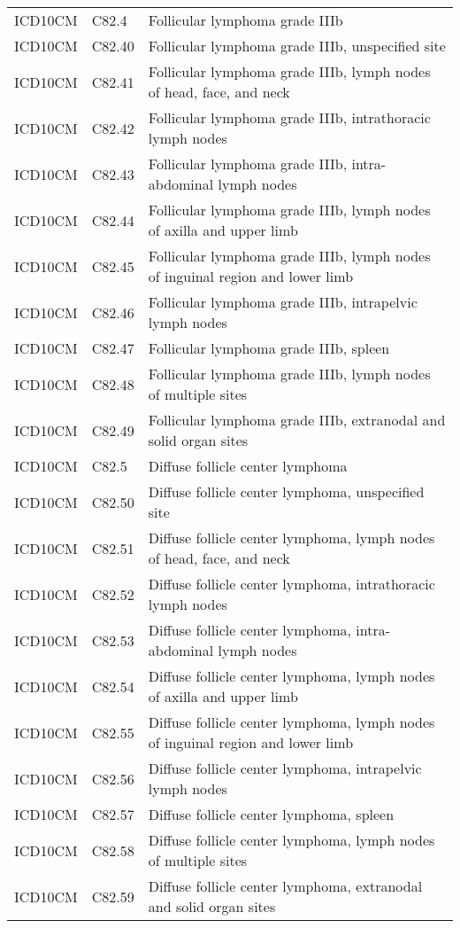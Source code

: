\begin{table}[ht]
\begin{tabular}{lll}
  ICD10CM & C82.4 & Follicular lymphoma grade IIIb \\ 
  ICD10CM & C82.40 & Follicular lymphoma grade IIIb, unspecified site \\ 
  ICD10CM & C82.41 & Follicular lymphoma grade IIIb, lymph nodes of head, face, and neck \\ 
  ICD10CM & C82.42 & Follicular lymphoma grade IIIb, intrathoracic lymph nodes \\ 
  ICD10CM & C82.43 & Follicular lymphoma grade IIIb, intra-abdominal lymph nodes \\ 
  ICD10CM & C82.44 & Follicular lymphoma grade IIIb, lymph nodes of axilla and upper limb \\ 
  ICD10CM & C82.45 & Follicular lymphoma grade IIIb, lymph nodes of inguinal region and lower limb \\ 
  ICD10CM & C82.46 & Follicular lymphoma grade IIIb, intrapelvic lymph nodes \\ 
  ICD10CM & C82.47 & Follicular lymphoma grade IIIb, spleen \\ 
  ICD10CM & C82.48 & Follicular lymphoma grade IIIb, lymph nodes of multiple sites \\ 
  ICD10CM & C82.49 & Follicular lymphoma grade IIIb, extranodal and solid organ sites \\ 
  ICD10CM & C82.5 & Diffuse follicle center lymphoma \\ 
  ICD10CM & C82.50 & Diffuse follicle center lymphoma, unspecified site \\ 
  ICD10CM & C82.51 & Diffuse follicle center lymphoma, lymph nodes of head, face, and neck \\ 
  ICD10CM & C82.52 & Diffuse follicle center lymphoma, intrathoracic lymph nodes \\ 
  ICD10CM & C82.53 & Diffuse follicle center lymphoma, intra-abdominal lymph nodes \\ 
  ICD10CM & C82.54 & Diffuse follicle center lymphoma, lymph nodes of axilla and upper limb \\ 
  ICD10CM & C82.55 & Diffuse follicle center lymphoma, lymph nodes of inguinal region and lower limb \\ 
  ICD10CM & C82.56 & Diffuse follicle center lymphoma, intrapelvic lymph nodes \\ 
  ICD10CM & C82.57 & Diffuse follicle center lymphoma, spleen \\ 
  ICD10CM & C82.58 & Diffuse follicle center lymphoma, lymph nodes of multiple sites \\ 
  ICD10CM & C82.59 & Diffuse follicle center lymphoma, extranodal and solid organ sites \\ 

\end{tabular}
\end{table}
